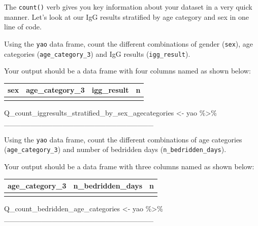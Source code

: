 \documentclass[
  letterpaper,
  DIV=11,
  numbers=noendperiod]{scrreprt}
\newenvironment{Shaded}{\begin{snugshade}}{\end{snugshade}}
\newcommand{\NormalTok}[1]{\textcolor[rgb]{0.00,0.23,0.31}{#1}}
\newcommand{\OtherTok}[1]{\textcolor[rgb]{0.00,0.23,0.31}{#1}}
\newcommand{\SpecialCharTok}[1]{\textcolor[rgb]{0.37,0.37,0.37}{#1}}
\begin{document}
\begin{tcolorbox}[enhanced jigsaw, colframe=quarto-callout-tip-color-frame, rightrule=.15mm, opacityback=0, breakable, coltitle=black, colbacktitle=quarto-callout-tip-color!10!white, bottomrule=.15mm, leftrule=.75mm, toprule=.15mm, arc=.35mm, bottomtitle=1mm, colback=white, left=2mm, opacitybacktitle=0.6, titlerule=0mm, title=\textcolor{quarto-callout-tip-color}{\faLightbulb}\hspace{0.5em}{Practice}, toptitle=1mm]

The \texttt{count()} verb gives you key information about your dataset
in a very quick manner. Let's look at our IgG results stratified by age
category and sex in one line of code.

Using the \texttt{yao} data frame, count the different combinations of
gender (\texttt{sex}), age categories (\texttt{age\_category\_3}) and
IgG results (\texttt{igg\_result}).

Your output should be a data frame with four columns named as shown
below:

\begin{longtable}[]{@{}llll@{}}
\toprule\noalign{}
sex & age\_category\_3 & igg\_result & n \\
\midrule\noalign{}
\endhead
\bottomrule\noalign{}
\endlastfoot
& & & \\
\end{longtable}

\begin{Shaded}
\begin{Highlighting}[]
\NormalTok{Q\_count\_iggresults\_stratified\_by\_sex\_agecategories }\OtherTok{\textless{}{-}} 
\NormalTok{  yao }\SpecialCharTok{\%\textgreater{}\%}
\NormalTok{  \_\_\_\_\_\_\_\_\_\_\_\_\_\_\_\_\_\_\_\_\_\_\_\_\_\_\_\_}
\end{Highlighting}
\end{Shaded}

Using the \texttt{yao} data frame, count the different combinations of
age categories (\texttt{age\_category\_3}) and number of bedridden days
(\texttt{n\_bedridden\_days}).

Your output should be a data frame with three columns named as shown
below:

\begin{longtable}[]{@{}lll@{}}
\toprule\noalign{}
age\_category\_3 & n\_bedridden\_days & n \\
\midrule\noalign{}
\endhead
\bottomrule\noalign{}
\endlastfoot
& & \\
\end{longtable}

\begin{Shaded}
\begin{Highlighting}[]
\NormalTok{Q\_count\_bedridden\_age\_categories }\OtherTok{\textless{}{-}} 
\NormalTok{  yao }\SpecialCharTok{\%\textgreater{}\%}
\NormalTok{  \_\_\_\_\_\_\_\_\_\_\_\_\_\_\_\_\_\_\_\_\_\_\_\_\_\_\_\_}
\end{Highlighting}
\end{Shaded}

\end{tcolorbox}
\end{document}
